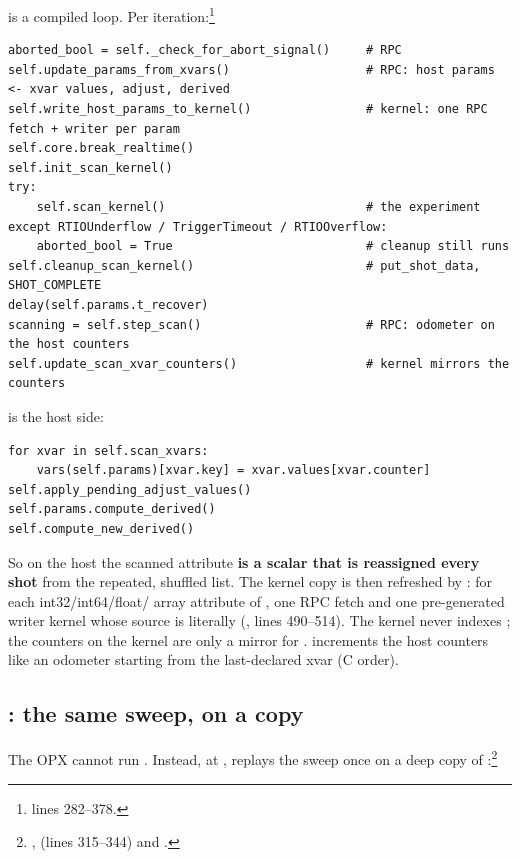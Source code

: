 is a compiled   loop. Per
iteration:\footnote{ lines 282--378.}

\begin{lstlisting}[style=py]
aborted_bool = self._check_for_abort_signal()     # RPC
self.update_params_from_xvars()                   # RPC: host params <- xvar values, adjust, derived
self.write_host_params_to_kernel()                # kernel: one RPC fetch + writer per param
self.core.break_realtime()
self.init_scan_kernel()
try:
    self.scan_kernel()                            # the experiment
except RTIOUnderflow / TriggerTimeout / RTIOOverflow:
    aborted_bool = True                           # cleanup still runs
self.cleanup_scan_kernel()                        # put_shot_data, SHOT_COMPLETE
delay(self.params.t_recover)
scanning = self.step_scan()                       # RPC: odometer on the host counters
self.update_scan_xvar_counters()                  # kernel mirrors the counters
\end{lstlisting}

 is the host side:

\begin{lstlisting}[style=py]
for xvar in self.scan_xvars:
    vars(self.params)[xvar.key] = xvar.values[xvar.counter]
self.apply_pending_adjust_values()
self.params.compute_derived()
self.compute_new_derived()
\end{lstlisting}

So on the host the scanned attribute \textbf{is a scalar that is reassigned
every shot} from the repeated, shuffled list. The kernel copy is then
refreshed by : for each int32/int64/float/
array attribute of , one RPC fetch and one pre-generated
writer kernel whose source is literally 
(,  lines 490--514). The
kernel never indexes ; the counters on the kernel are only
a mirror for .  increments the host
counters like an odometer starting from the last-declared xvar (C order).

\subsection{: the same sweep, on a copy}
\label{sec:xvars:tables}

The OPX cannot run . Instead, at
,  replays the
sweep once on a deep copy of :\footnote{,
 (lines 315--344) and .}

